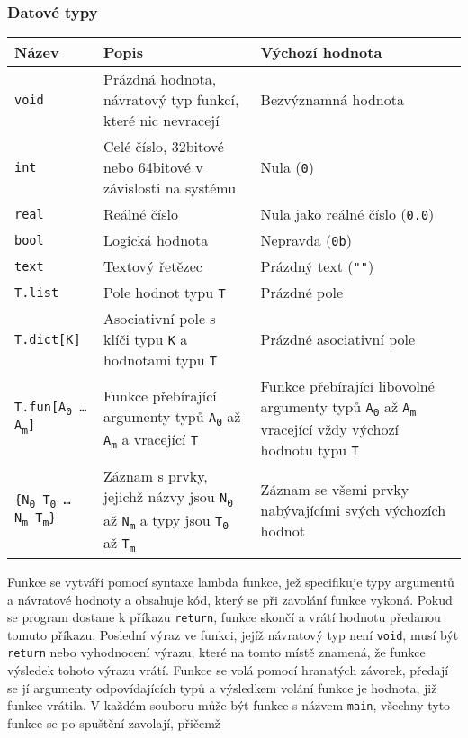 \documentclass[a4paper,12pt]{article}
\def\quote #1{"#1"}
\begin{document}
\subsubsection{Datové typy}
\begin{tabular}{|m{3.5cm} m{6cm} m{5cm}|}\hline
Název & Popis & Výchozí hodnota \\\hline
\texttt{void} & Prázdná hodnota, návratový typ funkcí, které nic nevracejí & Bezvýznamná hodnota\\\hline
\texttt{int} & Celé číslo, 32bitové nebo 64bitové v závislosti na systému & Nula (\texttt{0})\\\hline
\texttt{real} & Reálné číslo & Nula jako reálné číslo (\texttt{0.0})\\\hline
\texttt{bool} & Logická hodnota & Nepravda (\texttt{0b})\\\hline
\texttt{text} & Textový řetězec & Prázdný text (\texttt{\quote{}})\\\hline
\texttt{T.list} & Pole hodnot typu \texttt{T} & Prázdné pole\\\hline
\texttt{T.dict[K]} & Asociativní pole s klíči typu \texttt{K} a hodnotami typu \texttt{T} & Prázdné asociativní pole\\\hline
\texttt{T.fun[A\textsubscript{0} \ldots{} A\textsubscript{m}]} & Funkce přebírající argumenty typů \texttt{A\textsubscript{0}} až \texttt{A\textsubscript{m}} a vracející \texttt{T} & Funkce přebírající libovolné argumenty typů \texttt{A\textsubscript{0}} až \texttt{A\textsubscript{m}} vracející vždy výchozí hodnotu typu \texttt{T}\\\hline
\texttt{\{N\textsubscript{0} T\textsubscript{0} \ldots{} N\textsubscript{m} T\textsubscript{m}\}} & Záznam s prvky, jejichž názvy jsou \texttt{N\textsubscript{0}} až \texttt{N\textsubscript{m}} a typy jsou \texttt{T\textsubscript{0}} až \texttt{T\textsubscript{m}} & Záznam se všemi prvky nabývajícími svých výchozích hodnot\\\hline
\end{tabular}

Funkce se vytváří pomocí syntaxe lambda funkce, jež specifikuje typy argumentů a návratové hodnoty a obsahuje kód, který se při zavolání funkce vykoná. Pokud se program dostane k příkazu \texttt{return}, funkce skončí a vrátí hodnotu předanou tomuto příkazu. Poslední výraz ve funkci, jejíž návratový typ není \texttt{void}, musí být \texttt{return} nebo vyhodnocení výrazu, které na tomto místě znamená, že funkce výsledek tohoto výrazu vrátí. Funkce se volá pomocí hranatých závorek, předají se jí argumenty odpovídajících typů a výsledkem volání funkce je hodnota, již funkce vrátila. V každém souboru může být funkce s názvem \texttt{main}, všechny tyto funkce se po spuštění zavolají, přičemž 
\end{document}
